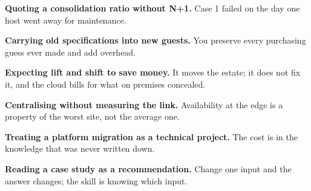 \begin{pitfall}
\begin{tight}
  \item \textbf{Quoting a consolidation ratio without N+1.} Case 1 failed on
        the day one host went away for maintenance.
  \item \textbf{Carrying old specifications into new guests.} You preserve
        every purchasing guess ever made and add overhead.
  \item \textbf{Expecting lift and shift to save money.} It moves the estate;
        it does not fix it, and the cloud bills for what on premises concealed.
  \item \textbf{Centralising without measuring the link.} Availability at the
        edge is a property of the worst site, not the average one.
  \item \textbf{Treating a platform migration as a technical project.} The cost
        is in the knowledge that was never written down.
  \item \textbf{Reading a case study as a recommendation.} Change one input and
        the answer changes; the skill is knowing which input.
\end{tight}
\end{pitfall}

